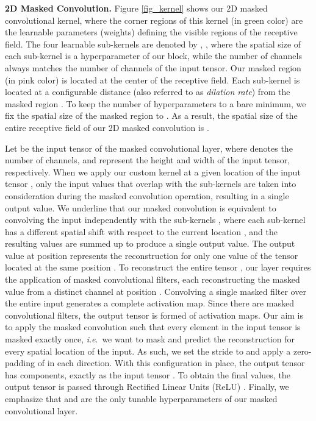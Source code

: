 \documentclass[10pt,journal,compsoc]{IEEEtran}
\newcommand{\ie}{\textit{i}.\textit{e}.}
\begin{document}
\noindent
\textbf{2D Masked Convolution.} Figure \ref{fig_kernel} shows our 2D masked convolutional kernel, where the corner regions of this kernel (in green color) are the learnable parameters (weights) defining the visible regions of the receptive field. The four learnable sub-kernels are denoted by , , where the spatial size  of each sub-kernel is a hyperparameter of our block, while the number of channels  always matches the number of channels of the input tensor. Our masked region  (in pink color) is located at the center of the receptive field. Each sub-kernel  is located at a configurable distance  (also referred to as  \emph{dilation rate}) from the masked region . To keep the number of hyperparameters to a bare minimum, we fix the spatial size of the masked region to . As a result, the spatial size  of the entire receptive field of our 2D masked convolution is . 

Let  be the input tensor of the masked convolutional layer, where  denotes the number of channels, and  represent the height and width of the input tensor, respectively. When we apply our custom kernel at a given location  of the input tensor , only the input values that overlap with the sub-kernels  are taken into consideration during the masked convolution operation, resulting in a single output value. We underline that our masked convolution is equivalent to convolving the input independently with the sub-kernels , where each sub-kernel has a different spatial shift with respect to the current location , and the resulting values are summed up to produce a single output value. The output value at position  represents the reconstruction for only one value of the tensor  located at the same position . To reconstruct the entire tensor , our layer requires the application of  masked convolutional filters, each reconstructing the masked value from a distinct channel at position . Convolving a single masked filter over the entire input generates a complete activation map. Since there are  masked convolutional filters, the output tensor  is formed of  activation maps. Our aim is to apply the masked convolution such that every element in the input tensor is masked exactly once, \ie~we want to mask and predict the reconstruction for every spatial location of the input. As such, we set the stride to  and apply a zero-padding of  in each direction. With this configuration in place, the output tensor  has  components, exactly as the input tensor . To obtain the final values, the output tensor  is passed through Rectified Linear Units (ReLU) \cite{Nair-ICML-2010}. Finally, we emphasize that  and  are the only tunable hyperparameters of our masked convolutional layer.
\end{document}
